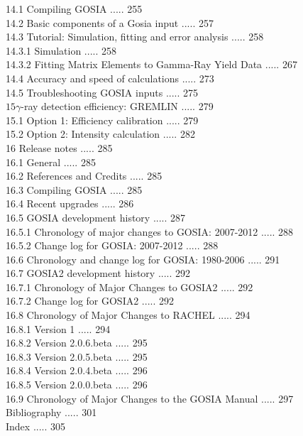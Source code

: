 \documentclass[10pt]{article}
\begin{document}
14.1 Compiling GOSIA ..... 255\\
14.2 Basic components of a Gosia input ..... 257\\
14.3 Tutorial: Simulation, fitting and error analysis ..... 258\\
14.3.1 Simulation ..... 258\\
14.3.2 Fitting Matrix Elements to Gamma-Ray Yield Data ..... 267\\
14.4 Accuracy and speed of calculations ..... 273\\
14.5 Troubleshooting GOSIA inputs ..... 275\\
$15 \gamma$-ray detection efficiency: GREMLIN ..... 279\\
15.1 Option 1: Efficiency calibration ..... 279\\
15.2 Option 2: Intensity calculation ..... 282\\
16 Release notes ..... 285\\
16.1 General ..... 285\\
16.2 References and Credits ..... 285\\
16.3 Compiling GOSIA ..... 285\\
16.4 Recent upgrades ..... 286\\
16.5 GOSIA development history ..... 287\\
16.5.1 Chronology of major changes to GOSIA: 2007-2012 ..... 288\\
16.5.2 Change log for GOSIA: 2007-2012 ..... 288\\
16.6 Chronology and change log for GOSIA: 1980-2006 ..... 291\\
16.7 GOSIA2 development history ..... 292\\
16.7.1 Chronology of Major Changes to GOSIA2 ..... 292\\
16.7.2 Change log for GOSIA2 ..... 292\\
16.8 Chronology of Major Changes to RACHEL ..... 294\\
16.8.1 Version 1 ..... 294\\
16.8.2 Version 2.0.6.beta ..... 295\\
16.8.3 Version 2.0.5.beta ..... 295\\
16.8.4 Version 2.0.4.beta ..... 296\\
16.8.5 Version 2.0.0.beta ..... 296\\
16.9 Chronology of Major Changes to the GOSIA Manual ..... 297\\
Bibliography ..... 301\\
Index ..... 305
\end{document}
